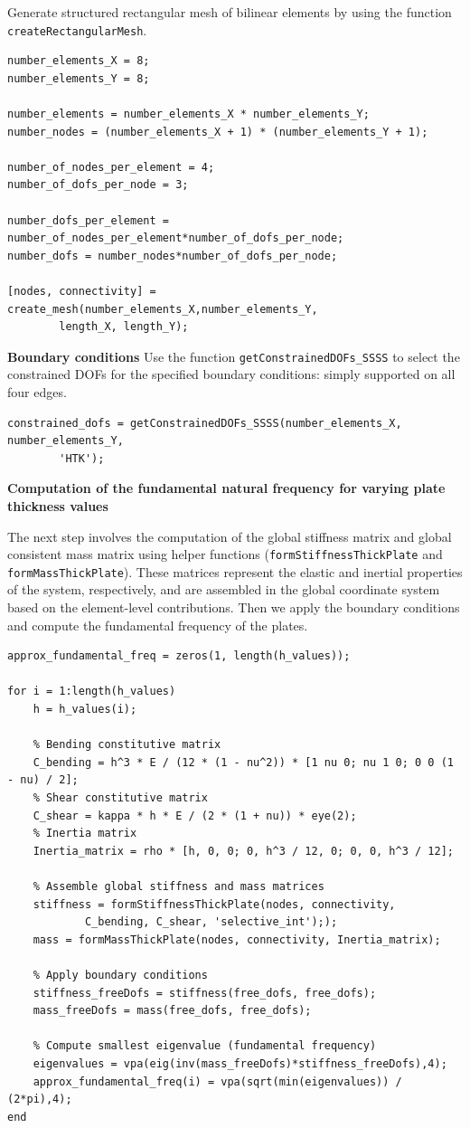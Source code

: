 \documentclass[12pt]{article}
\begin{document}
Generate structured rectangular mesh of bilinear elements by using the function \texttt{createRectangularMesh}.
\begin{verbatim}
number_elements_X = 8;
number_elements_Y = 8;

number_elements = number_elements_X * number_elements_Y;
number_nodes = (number_elements_X + 1) * (number_elements_Y + 1); 

number_of_nodes_per_element = 4;
number_of_dofs_per_node = 3;

number_dofs_per_element = number_of_nodes_per_element*number_of_dofs_per_node;
number_dofs = number_nodes*number_of_dofs_per_node;

[nodes, connectivity] = create_mesh(number_elements_X,number_elements_Y, 
        length_X, length_Y);
\end{verbatim}
\textbf{Boundary conditions}
Use the function \texttt{getConstrainedDOFs\_SSSS} to select the constrained DOFs for the specified boundary conditions: simply supported on all four edges.

\begin{verbatim}
constrained_dofs = getConstrainedDOFs_SSSS(number_elements_X, number_elements_Y, 
        'HTK');
\end{verbatim}

\textbf{Computation of the fundamental natural frequency for varying plate thickness values}

The next step involves the computation of the global stiffness matrix and global consistent mass matrix using helper functions (\texttt{formStiffnessThickPlate} and \texttt{formMassThickPlate}). These matrices represent the elastic and inertial properties of the system, respectively, and are assembled in the global coordinate system based on the element-level contributions. Then we apply the boundary conditions and compute the fundamental frequency of the plates.

\begin{verbatim}
approx_fundamental_freq = zeros(1, length(h_values));

for i = 1:length(h_values)
    h = h_values(i);

    % Bending constitutive matrix
    C_bending = h^3 * E / (12 * (1 - nu^2)) * [1 nu 0; nu 1 0; 0 0 (1 - nu) / 2];
    % Shear constitutive matrix
    C_shear = kappa * h * E / (2 * (1 + nu)) * eye(2);
    % Inertia matrix
    Inertia_matrix = rho * [h, 0, 0; 0, h^3 / 12, 0; 0, 0, h^3 / 12];

    % Assemble global stiffness and mass matrices
    stiffness = formStiffnessThickPlate(nodes, connectivity,
            C_bending, C_shear, 'selective_int'););
    mass = formMassThickPlate(nodes, connectivity, Inertia_matrix);
    
    % Apply boundary conditions 
    stiffness_freeDofs = stiffness(free_dofs, free_dofs);
    mass_freeDofs = mass(free_dofs, free_dofs);
    
    % Compute smallest eigenvalue (fundamental frequency)
    eigenvalues = vpa(eig(inv(mass_freeDofs)*stiffness_freeDofs),4);
    approx_fundamental_freq(i) = vpa(sqrt(min(eigenvalues)) / (2*pi),4);
end
\end{verbatim}
\end{document}
